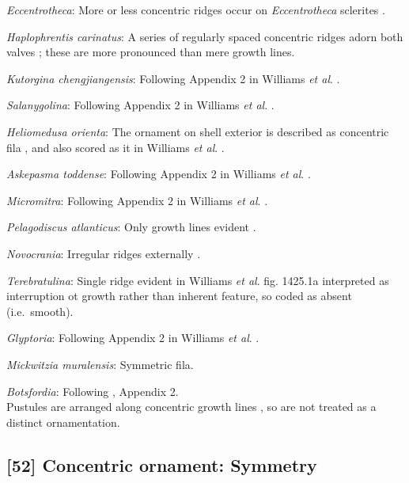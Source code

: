 \documentclass[]{book}
\theoremstyle{definition}
\theoremstyle{definition}
\theoremstyle{definition}
\theoremstyle{remark}
\begin{document}
\emph{Eccentrotheca}: More or less concentric ridges occur on
\emph{Eccentrotheca} sclerites
\citep{Skovsted2011Scleritomeconstruction}.

\emph{Haplophrentis carinatus}: A series of regularly spaced concentric
ridges adorn both valves \citep{Moysiuk2017Hyolithsare}; these are more
pronounced than mere growth lines.

\emph{Kutorgina chengjiangensis}: Following Appendix 2 in Williams
\emph{et al}. \citeyearpar{Williams1998Thediversity}.

\emph{Salanygolina}: Following Appendix 2 in Williams \emph{et al}.
\citeyearpar{Williams1998Thediversity}.

\emph{Heliomedusa orienta}: The ornament on shell exterior is described
as concentric fila \citep[P.43]{Chen2007Reinterpretationof}, and also
scored as it in Williams \emph{et al}.
\citeyearpar[pp.160--163]{Williams2000BrachiopodaLinguliformea}.

\emph{Askepasma toddense}: Following Appendix 2 in Williams \emph{et
al}. \citeyearpar{Williams1998Thediversity}.

\emph{Micromitra}: Following Appendix 2 in Williams \emph{et al}.
\citeyearpar{Williams1998Thediversity}.

\emph{Pelagodiscus atlanticus}: Only growth lines evident
\citep{Williams2000BrachiopodaLinguliformea}.

\emph{Novocrania}: Irregular ridges externally
\citep{Williams2000BrachiopodaLinguliformea}.

\emph{Terebratulina}: Single ridge evident in Williams \emph{et al}.
\citeyearpar{Williams2006Rhynchonelliformeapart} fig. 1425.1a
interpreted as interruption ot growth rather than inherent feature, so
coded as absent (i.e.~smooth).

\emph{Glyptoria}: Following Appendix 2 in Williams \emph{et al}.
\citeyearpar{Williams1998Thediversity}.

\emph{Mickwitzia muralensis}: Symmetric fila.

\emph{Botsfordia}: Following \citet{Williams1998Thediversity}, Appendix
2.\\
Pustules are arranged along concentric growth lines
\citep{Skovsted2005EarlyCambrian}, so are not treated as a distinct
ornamentation.

\hypertarget{concentric-ornament-symmetry}{%
\subsection*{{[}52{]} Concentric ornament:
Symmetry}\label{concentric-ornament-symmetry}}
\end{document}
